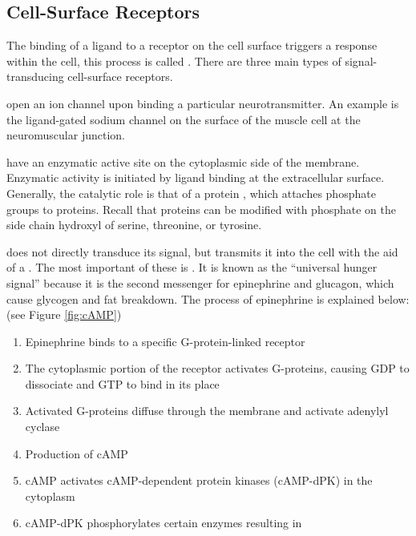 \documentclass[../Bio_chemistryReview.tex]{subfiles}
\begin{document}
\subsection{Cell-Surface Receptors}
The binding of a ligand to a receptor on the cell surface triggers a response
within the cell, this process is called . There are
three main types of signal-transducing cell-surface receptors.
\begin{description}
  \item {} open an ion
      channel upon binding a particular neurotransmitter. An example is the
      ligand-gated sodium channel on the surface of the muscle cell at the
      neuromuscular junction.
  \item {} have an enzymatic
      active site on the cytoplasmic side of the membrane. Enzymatic activity is
      initiated by ligand binding at the extracellular surface. Generally, the
      catalytic role is that of a protein , which attaches
      phosphate groups to proteins. Recall that proteins can be modified with
      phosphate on the side chain hydroxyl of serine, threonine, or tyrosine.
  \item {} does not
      directly transduce its signal, but transmits it into the cell with the aid
      of a . The most important of these is
      . It is known as the ``universal
      hunger signal'' because it is the second messenger for epinephrine and
      glucagon, which cause glycogen and fat breakdown. The process of
      epinephrine is explained below: (see Figure \ref{fig:cAMP})
      \begin{enumerate}
          \item Epinephrine binds to a specific G-protein-linked receptor
          \item The cytoplasmic portion of the receptor activates G-proteins,
              causing GDP to dissociate and GTP to bind in its place
          \item Activated G-proteins diffuse through the membrane and activate
              adenylyl cyclase
          \item Production of cAMP
          \item cAMP activates cAMP-dependent protein kinases (cAMP-dPK) in the
              cytoplasm
          \item cAMP-dPK phosphorylates certain enzymes resulting in

\end{enumerate}
\end{description}
\end{document}
